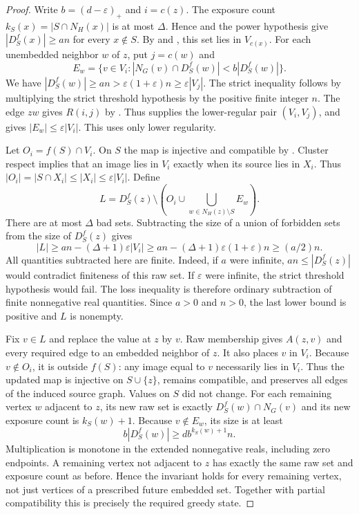\begin{proof}
Write $b=(d-\varepsilon)_+$ and $i=c(z)$. The exposure count
$k_S(x)=|S\cap N_H(x)|$ is at most $\Delta$. Hence
 and the power hypothesis give
$|D_S^f(x)|\geq an$ for every $x\notin S$. By
 and , this set lies
in $V_{c(x)}$.
For each unembedded neighbor $w$ of $z$, put $j=c(w)$ and
\[
 E_w=\{v\in V_i:|N_G(v)\cap D_S^f(w)|<b|D_S^f(w)|\}.
\]
We have $|D_S^f(w)|\geq an>\varepsilon(1+\varepsilon)n
\geq\varepsilon|V_j|$. The strict inequality follows by multiplying
the strict threshold hypothesis by the positive finite integer $n$.
The edge $zw$ gives $R(i,j)$ by .
Thus  supplies the lower-regular pair
$(V_i,V_j)$, and  gives
$|E_w|\leq\varepsilon|V_i|$. This uses only lower regularity.

Let $O_i=f(S)\cap V_i$. On $S$ the map is injective and compatible
by . Cluster respect implies
that an image lies in $V_i$ exactly when its source lies in $X_i$.
Thus $|O_i|=|S\cap X_i|\leq|X_i|\leq\varepsilon|V_i|$.
Define
\[
 L=D_S^f(z)\setminus\left(O_i\cup
                      \bigcup_{w\in N_H(z)\setminus S}E_w\right).
\]
There are at most $\Delta$ bad sets. Subtracting the size of a union
of forbidden sets from the size of $D_S^f(z)$ gives
\[
 |L|\geq an-(\Delta+1)\varepsilon|V_i|
 \geq an-(\Delta+1)\varepsilon(1+\varepsilon)n\geq(a/2)n.
\]
All quantities subtracted here are finite. Indeed, if $a$ were infinite,
$an\leq|D_S^f(z)|$ would contradict finiteness of this raw set.
If $\varepsilon$ were infinite, the strict threshold hypothesis would
fail. The loss inequality is therefore ordinary subtraction of finite
nonnegative real quantities. Since $a>0$ and $n>0$, the last lower
bound is positive and $L$ is nonempty.

Fix $v\in L$ and replace the value at $z$ by $v$. Raw membership
gives $A(z,v)$ and every required edge to an embedded neighbor of $z$.
It also places $v$ in $V_i$. Because $v\notin O_i$, it is outside
$f(S)$: any image equal to $v$ necessarily lies in $V_i$. Thus the
updated map is injective on $S\cup\{z\}$, remains compatible, and
preserves all edges of the induced source graph. Values on $S$ did
not change. For each remaining vertex $w$ adjacent to $z$, its new
raw set is exactly $D_S^f(w)\cap N_G(v)$ and its new exposure count
is $k_S(w)+1$. Because $v\notin E_w$, its size is at least
\[
 b|D_S^f(w)|\geq d b^{k_S(w)+1}n.
\]
Multiplication is monotone in the extended nonnegative reals, including
zero endpoints. A remaining vertex not adjacent to $z$ has exactly
the same raw set and exposure count as before. Hence the invariant
holds for every remaining vertex, not just vertices of a prescribed
future embedded set. Together with partial compatibility this is
precisely the required greedy state.
\end{proof}

